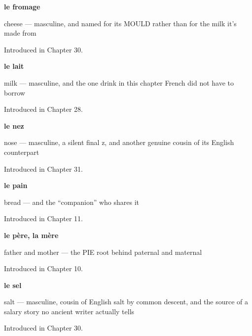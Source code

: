 \noindent\begin{minipage}[t]{\linewidth}
\raggedright
\textbf{le fromage}\par
\small cheese — masculine, and named for its MOULD rather than for the milk it's made from\par
\footnotesize Introduced in Chapter 30.
\end{minipage}\par\medskip

\noindent\begin{minipage}[t]{\linewidth}
\raggedright
\textbf{le lait}\par
\small milk — masculine, and the one drink in this chapter French did not have to borrow\par
\footnotesize Introduced in Chapter 28.
\end{minipage}\par\medskip

\noindent\begin{minipage}[t]{\linewidth}
\raggedright
\textbf{le nez}\par
\small nose — masculine, a silent final z, and another genuine cousin of its English counterpart\par
\footnotesize Introduced in Chapter 31.
\end{minipage}\par\medskip

\noindent\begin{minipage}[t]{\linewidth}
\raggedright
\textbf{le pain}\par
\small bread — and the \textquotedblleft{}companion\textquotedblright{} who shares it\par
\footnotesize Introduced in Chapter 11.
\end{minipage}\par\medskip

\noindent\begin{minipage}[t]{\linewidth}
\raggedright
\textbf{le père, la mère}\par
\small father and mother — the PIE root behind paternal and maternal\par
\footnotesize Introduced in Chapter 10.
\end{minipage}\par\medskip

\noindent\begin{minipage}[t]{\linewidth}
\raggedright
\textbf{le sel}\par
\small salt — masculine, cousin of English salt by common descent, and the source of a salary story no ancient writer actually tells\par
\footnotesize Introduced in Chapter 30.
\end{minipage}\par\medskip

